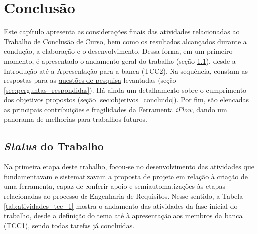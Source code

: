 \chapter[Conclusão]{Conclusão}

\label{chap:consideracoes_finais}

Este capítulo apresenta as considerações finais das atividades relacionadas ao Trabalho de Conclusão de Curso, bem como os resultados alcançados durante a condução, a elaboração e o desenvolvimento. Dessa forma, em um primeiro momento, é apresentado o andamento geral do trabalho (seção \ref{sec:andamento_do_trabalho}), desde a Introdução até a Apresentação para a banca (TCC2). Na sequência, constam as respostas para as \hyperref[ref:questao_pesquisa]{questões de pesquisa} levantadas (seção \ref{sec:perguntas_respondidas}). Há ainda um detalhamento sobre o cumprimento dos \hyperref[ref:objetivos]{objetivos} propostos (seção \ref{sec:objetivos_concluido}). Por fim, são elencadas as principais contribuições e fragilidades da \hyperref[chap:proposta]{Ferramenta \textit{iFlow}}, dando um panorama de melhorias para trabalhos futuros.

\section{\textit{Status} do Trabalho}

\label{sec:andamento_do_trabalho}

Na primeira etapa deste trabalho, focou-se no desenvolvimento das atividades que fundamentavam e sistematizavam a proposta de projeto em relação à criação de uma ferramenta, capaz de conferir apoio e semiautomatizações às etapas relacionadas ao processo de Engenharia de Requisitos. Nesse sentido, a Tabela \ref{tab:atividades_tcc_1} mostra o andamento das atividades da fase inicial do trabalho, desde a definição do tema até à apresentação aos membros da banca (TCC1), sendo todas tarefas já concluídas.

